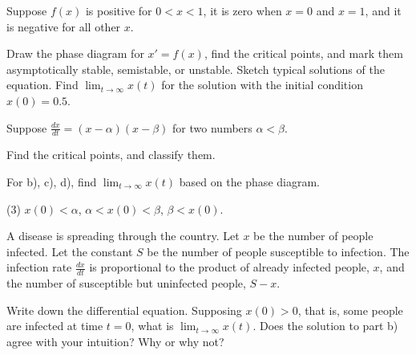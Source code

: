 \begin{exercise}
Suppose $f(x)$ is positive for $0 < x < 1$, it is zero when $x=0$ and $x=1$,
and it is negative for all other $x$.
\begin{tasks}
\task Draw the phase diagram for $x' = f(x)$,
find the critical points, and mark them asymptotically stable, semistable, or unstable.
\task Sketch typical solutions of the equation.
\task Find $\displaystyle \lim_{t\to \infty} x(t)$ for the solution with the initial condition
$x(0) = 0.5$.
\end{tasks}
\end{exercise}

\begin{exercise}\ansMark%
Suppose $\frac{dx}{dt} = (x-\alpha)(x-\beta)$ for two numbers $\alpha <
\beta$.
\begin{tasks}
\task Find the critical points, and classify them.
\end{tasks}
For b), c), d), find $\displaystyle \lim_{t\to\infty} x(t)$ based on
the phase diagram.
\begin{tasks}[resume](3)
\task $x(0) < \alpha$,
\task $\alpha < x(0) < \beta$,
\task $\beta < x(0)$.
\end{tasks}
\end{exercise}

\begin{exercise}
A disease is spreading through the country.  Let $x$ be the number of people
infected.  Let the constant $S$ be the number of people susceptible to
infection.  The infection rate $\frac{dx}{dt}$ is proportional to the product
of already infected people, $x$, and the number of susceptible but
uninfected people, $S-x$.
\begin{tasks}
\task Write down the differential equation.
\task Supposing $x(0) > 0$, that is, some people are infected at time $t=0$,
what is
$\displaystyle \lim_{t\to\infty} x(t)$.
\task Does the solution to part b) agree with your intuition?  Why or why not?
\end{tasks}
\end{exercise}


\setcounter{exercise}{100}
